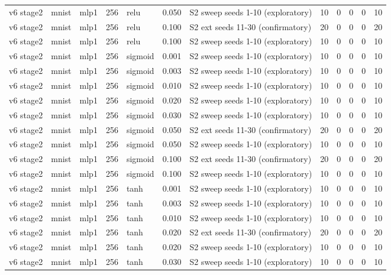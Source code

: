 \begin{table}[htbp]
{\begin{tabular}{@{}lllrlrlrrrrr@{}}
v6 stage2 & mnist & mlp1 & 256 & relu & 0.050 & S2 sweep seeds 1-10 (exploratory) & 10 & 0 & 0 & 0 & 10 \\
v6 stage2 & mnist & mlp1 & 256 & relu & 0.100 & S2 ext seeds 11-30 (confirmatory) & 20 & 0 & 0 & 0 & 20 \\
v6 stage2 & mnist & mlp1 & 256 & relu & 0.100 & S2 sweep seeds 1-10 (exploratory) & 10 & 0 & 0 & 0 & 10 \\
v6 stage2 & mnist & mlp1 & 256 & sigmoid & 0.001 & S2 sweep seeds 1-10 (exploratory) & 10 & 0 & 0 & 0 & 10 \\
v6 stage2 & mnist & mlp1 & 256 & sigmoid & 0.003 & S2 sweep seeds 1-10 (exploratory) & 10 & 0 & 0 & 0 & 10 \\
v6 stage2 & mnist & mlp1 & 256 & sigmoid & 0.010 & S2 sweep seeds 1-10 (exploratory) & 10 & 0 & 0 & 0 & 10 \\
v6 stage2 & mnist & mlp1 & 256 & sigmoid & 0.020 & S2 sweep seeds 1-10 (exploratory) & 10 & 0 & 0 & 0 & 10 \\
v6 stage2 & mnist & mlp1 & 256 & sigmoid & 0.030 & S2 sweep seeds 1-10 (exploratory) & 10 & 0 & 0 & 0 & 10 \\
v6 stage2 & mnist & mlp1 & 256 & sigmoid & 0.050 & S2 ext seeds 11-30 (confirmatory) & 20 & 0 & 0 & 0 & 20 \\
v6 stage2 & mnist & mlp1 & 256 & sigmoid & 0.050 & S2 sweep seeds 1-10 (exploratory) & 10 & 0 & 0 & 0 & 10 \\
v6 stage2 & mnist & mlp1 & 256 & sigmoid & 0.100 & S2 ext seeds 11-30 (confirmatory) & 20 & 0 & 0 & 0 & 20 \\
v6 stage2 & mnist & mlp1 & 256 & sigmoid & 0.100 & S2 sweep seeds 1-10 (exploratory) & 10 & 0 & 0 & 0 & 10 \\
v6 stage2 & mnist & mlp1 & 256 & tanh & 0.001 & S2 sweep seeds 1-10 (exploratory) & 10 & 0 & 0 & 0 & 10 \\
v6 stage2 & mnist & mlp1 & 256 & tanh & 0.003 & S2 sweep seeds 1-10 (exploratory) & 10 & 0 & 0 & 0 & 10 \\
v6 stage2 & mnist & mlp1 & 256 & tanh & 0.010 & S2 sweep seeds 1-10 (exploratory) & 10 & 0 & 0 & 0 & 10 \\
v6 stage2 & mnist & mlp1 & 256 & tanh & 0.020 & S2 ext seeds 11-30 (confirmatory) & 20 & 0 & 0 & 0 & 20 \\
v6 stage2 & mnist & mlp1 & 256 & tanh & 0.020 & S2 sweep seeds 1-10 (exploratory) & 10 & 0 & 0 & 0 & 10 \\
v6 stage2 & mnist & mlp1 & 256 & tanh & 0.030 & S2 sweep seeds 1-10 (exploratory) & 10 & 0 & 0 & 0 & 10 \\

\end{tabular}}
\end{table}
